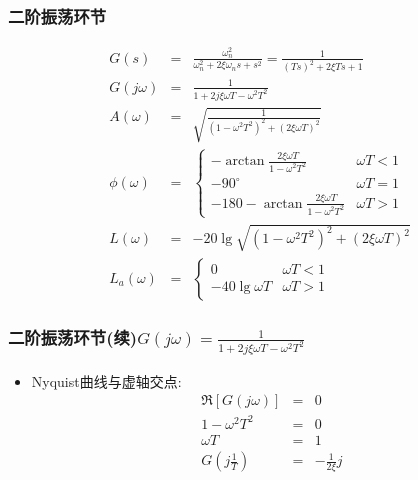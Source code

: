 \documentclass[table]{beamer}
\begin{document}
\subsubsection{二阶振荡环节}
\label{sec:org0c0383f}
\begin{eqnarray*}
G(s) & = & \frac{\omega_n^2}{\omega_n^2 +2\xi\omega_n s + s^2}
       =   \frac{1}{(Ts)^2+2\xi Ts+1} \\
G(j\omega) & =& \frac{1}{1+2j\xi\omega T-\omega^2 T^2}\\
A(\omega) &=& \sqrt{\frac{1}{(1-\omega^2 T^2)^2+(2\xi\omega T)^2}}\\
\phi(\omega) &=& 
\begin{cases}
-\arctan\frac{2\xi\omega T}{1-\omega^2 T^2} & \omega T <1 \\
-90^{\circ} & \omega T =1 \\
-180-\arctan\frac{2\xi\omega T}{1-\omega^2 T^2} & \omega T >1 
\end{cases} \\
L(\omega)&=& -20\lg\sqrt{(1-\omega^2 T^2)^2+(2\xi\omega T)^2}\\
L_a(\omega)&=& 
\begin{cases} 0 & \omega T<1 \\ 
-40\lg\omega T & \omega T>1
\end{cases}
\end{eqnarray*}

\subsubsection{二阶振荡环节(续)\(G(j\omega) = \frac{1}{1+2j\xi\omega T-\omega^2 T^2}\)}
\label{sec:orgb7873e6}
\begin{itemize}
\item Nyquist曲线与虚轴交点:
\begin{eqnarray*}
\Re[G(j\omega)] &=& 0\\
1-\omega^2 T^2 &=& 0\\
\omega T &=&1\\
G(j\frac{1}{T})&=&-\frac{1}{2\xi}j
\end{eqnarray*}
\end{itemize}
\end{document}
